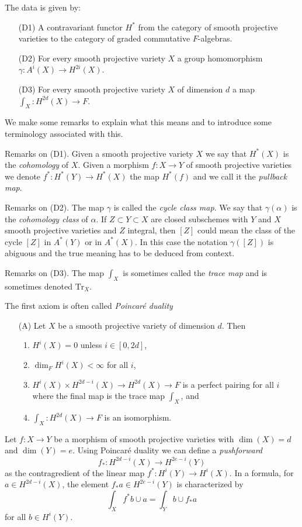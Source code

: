 \medskip\noindent
The data is given by:
\begin{enumerate}
\item[(D1)] A contravariant functor $H^*$ from the category
of smooth projective varieties to the category of
graded commutative $F$-algebras.
\item[(D2)] For every smooth projective variety $X$
a group homomorphism $\gamma : A^i(X) \to H^{2i}(X)$.
\item[(D3)] For every smooth projective variety $X$ of dimension $d$
a map $\int_X : H^{2d}(X) \to F$.
\end{enumerate}
We make some remarks to explain what this means and to introduce
some terminology associated with this.

\medskip\noindent
Remarks on (D1). Given a smooth projective variety $X$
we say that $H^*(X)$ is the {\it cohomology} of $X$. Given a morphism
$f : X \to Y$ of smooth projective varieties we denote
$f^* : H^*(Y) \to H^*(X)$ the map $H^*(f)$ and we call it the
{\it pullback map}.

\medskip\noindent
Remarks on (D2). The map $\gamma$ is called the {\it cycle class map}.
We say that $\gamma(\alpha)$ is the {\it cohomology class} of $\alpha$.
If $Z \subset Y \subset X$ are closed subschemes with $Y$ and $X$
smooth projective varieties and $Z$ integral, then $[Z]$ could
mean the class of the cycle $[Z]$ in $A^*(Y)$ or in $A^*(X)$.
In this case the notation $\gamma([Z])$ is abiguous and the true meaning
has to be deduced from context.

\medskip\noindent
Remarks on (D3). The map $\int_X$ is sometimes called the
{\it trace map} and is sometimes denoted $\text{Tr}_X$.

\medskip\noindent
The first axiom is often called {\it Poincar\'e duality}
\begin{enumerate}
\item[(A)] Let $X$ be a smooth projective variety of dimension $d$. Then
\begin{enumerate}
\item $H^i(X) = 0$ unless $i \in [0, 2d]$,
\item $\dim_F H^i(X) < \infty$ for all $i$,
\item $H^i(X) \times H^{2d - i}(X) \rightarrow H^{2d}(X) \rightarrow F$
is a perfect pairing for all $i$ where the final
map is the trace map $\int_X$, and
\item $\int_X : H^{2d}(X) \to F$ is an isomorphism.
\end{enumerate}
\end{enumerate}
Let $f : X \to Y$ be a morphism of smooth projective varieties
with $\dim(X) = d$ and $\dim(Y) = e$. Using Poincar\'e duality
we can define a {\it pushforward}
$$
f_* : H^{2d - i}(X) \longrightarrow H^{2e - i}(Y)
$$
as the contragredient of the linear map $f^* : H^i(Y) \to H^i(X)$. In a
formula, for $a \in H^{2d - i}(X)$, the element $f_*a \in H^{2e - i}(Y)$
is characterized by
$$
\int_X f^*b \cup a = \int_Y b \cup f_*a
$$
for all $b \in H^i(Y)$.

